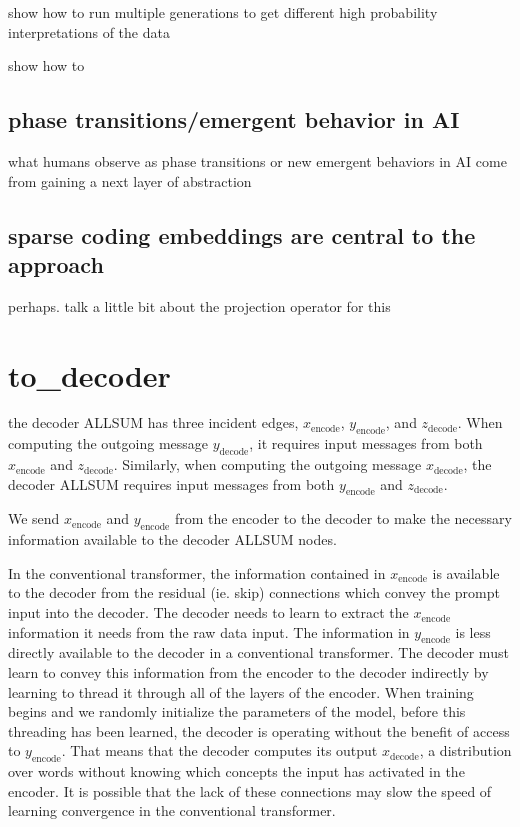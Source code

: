 show how to run multiple generations to get different high probability interpretations of the data

show how to 

\subsection{phase transitions/emergent behavior in AI}

what humans observe as phase transitions or new emergent behaviors in AI come from gaining a next layer of abstraction

\subsection{sparse coding embeddings are central to the approach}

perhaps.  talk a little bit about the projection operator for this




\section{to_decoder}

the decoder ALLSUM has three incident edges, $x_{\mathrm{encode}}$, $y_{\mathrm{encode}}$, and $z_{\mathrm{decode}}$.  When computing the outgoing message $y_{\mathrm{decode}}$, it requires input messages from both $x_{\mathrm{encode}}$ and $z_{\mathrm{decode}}$.  Similarly, when computing the outgoing message $x_{\mathrm{decode}}$, the decoder ALLSUM requires input messages from both $y_{\mathrm{encode}}$ and $z_{\mathrm{decode}}$.

We send $x_{\mathrm{encode}}$ and $y_{\mathrm{encode}}$ from the encoder to the decoder to make the necessary information available to the decoder ALLSUM nodes.

In the conventional transformer, the information contained in $x_{\mathrm{encode}}$ is available to the decoder from the residual (ie. skip) connections which convey the prompt input into the decoder.  The decoder needs to learn to extract the $x_{\mathrm{encode}}$ information it needs from the raw data input.  The information in $y_{\mathrm{encode}}$ is less directly available to the decoder in a conventional transformer. The decoder must learn to convey this information from the encoder to the decoder indirectly by learning to thread it through all of the layers of the encoder.  When training begins and we randomly initialize the parameters of the model, before this threading has been learned, the decoder is operating without the benefit of access to $y_{\mathrm{encode}}$.  That means that the decoder computes its output $x_{\mathrm{decode}}$, a distribution over words without knowing which concepts the input has activated in the encoder.  It is possible that the lack of these connections may slow the speed of learning convergence in the conventional transformer.





